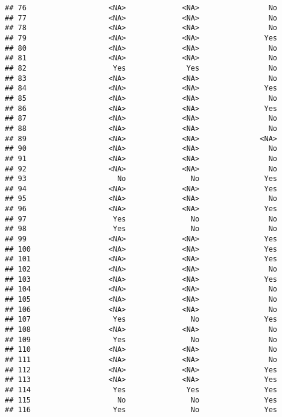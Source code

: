 \documentclass[
]{article}
\begin{document}
\begin{verbatim}
## 76                   <NA>             <NA>                No
## 77                   <NA>             <NA>                No
## 78                   <NA>             <NA>                No
## 79                   <NA>             <NA>               Yes
## 80                   <NA>             <NA>                No
## 81                   <NA>             <NA>                No
## 82                    Yes              Yes                No
## 83                   <NA>             <NA>                No
## 84                   <NA>             <NA>               Yes
## 85                   <NA>             <NA>                No
## 86                   <NA>             <NA>               Yes
## 87                   <NA>             <NA>                No
## 88                   <NA>             <NA>                No
## 89                   <NA>             <NA>              <NA>
## 90                   <NA>             <NA>                No
## 91                   <NA>             <NA>                No
## 92                   <NA>             <NA>                No
## 93                     No               No               Yes
## 94                   <NA>             <NA>               Yes
## 95                   <NA>             <NA>                No
## 96                   <NA>             <NA>               Yes
## 97                    Yes               No                No
## 98                    Yes               No                No
## 99                   <NA>             <NA>               Yes
## 100                  <NA>             <NA>               Yes
## 101                  <NA>             <NA>               Yes
## 102                  <NA>             <NA>                No
## 103                  <NA>             <NA>               Yes
## 104                  <NA>             <NA>                No
## 105                  <NA>             <NA>                No
## 106                  <NA>             <NA>                No
## 107                   Yes               No               Yes
## 108                  <NA>             <NA>                No
## 109                   Yes               No                No
## 110                  <NA>             <NA>                No
## 111                  <NA>             <NA>                No
## 112                  <NA>             <NA>               Yes
## 113                  <NA>             <NA>               Yes
## 114                   Yes              Yes               Yes
## 115                    No               No               Yes
## 116                   Yes               No               Yes

\end{verbatim}
\end{document}

